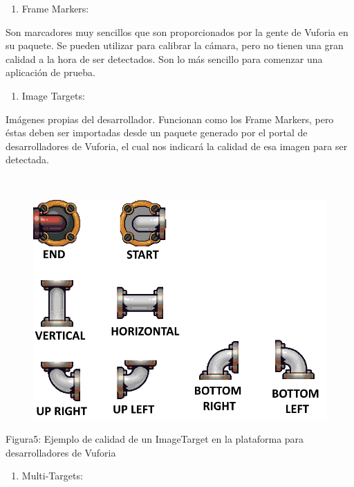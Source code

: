 \begin{enumerate}
\def\labelenumi{\arabic{enumi}.}
\itemsep1pt\parskip0pt
\item
  Frame Markers:
\end{enumerate}

Son marcadores muy sencillos que son proporcionados por la gente de
Vuforia en su paquete. Se pueden utilizar para calibrar la cámara, pero
no tienen una gran calidad a la hora de ser detectados. Son lo más
sencillo para comenzar una aplicación de prueba.

\begin{enumerate}
\def\labelenumi{\arabic{enumi}.}
\setcounter{enumi}{1}
\itemsep1pt\parskip0pt
\item
  Image Targets:
\end{enumerate}

Imágenes propias del desarrollador. Funcionan como los Frame Markers,
pero éstas deben ser importadas desde un paquete generado por el portal
de desarrolladores de Vuforia, el cual nos indicará la calidad de esa
imagen para ser detectada.

~~~~~~~~~~~~~~~~~ ~~~~~~~~~~~~~~~~~

\begin{figure}[htbp]
\centering
\includegraphics{images/image05.png}
\end{figure}

Figura5: Ejemplo de calidad de un ImageTarget en la plataforma para
desarrolladores de Vuforia

\begin{enumerate}
\def\labelenumi{\arabic{enumi}.}
\setcounter{enumi}{2}
\itemsep1pt\parskip0pt
\item
  Multi-Targets:
\end{enumerate}

